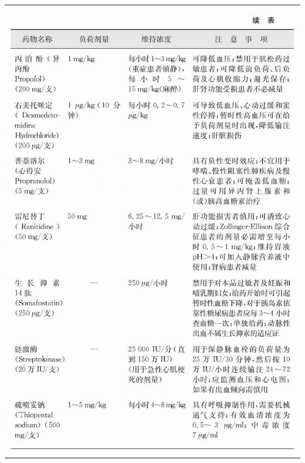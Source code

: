 \begin{longtable}{c}
\includegraphics[width=\textwidth,height=\textheight,keepaspectratio]{./images/Image00329.jpg}\\

\end{longtable}
